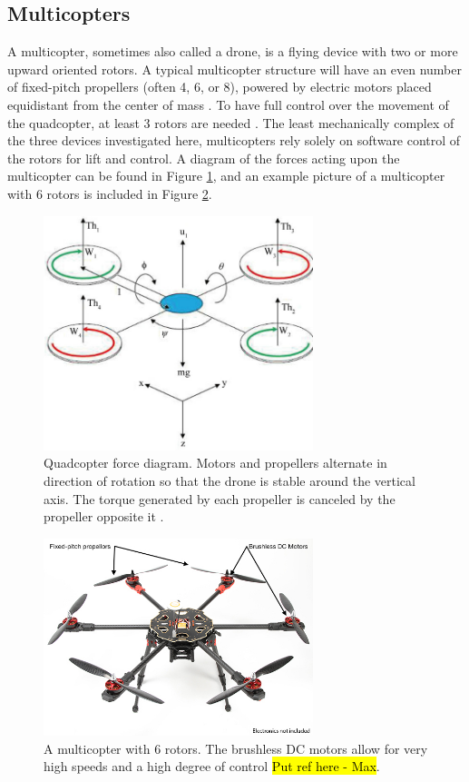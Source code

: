 \subsection{Multicopters}
A multicopter, sometimes also called a drone, is a flying device with two or more upward oriented rotors. A typical multicopter structure will have an even number of fixed-pitch propellers (often 4, 6, or 8), powered by electric motors placed equidistant from the center of mass \cite{multicopter_background}. To have full control over the movement of the quadcopter, at least 3 rotors are needed \cite{multicopter_dynamics_2}. The least mechanically complex of the three devices investigated here, multicopters rely solely on software control of the rotors for lift and control. A diagram of the forces acting upon the multicopter can be found in Figure \ref{fig:quad_diagram}, and an example picture of a multicopter with 6 rotors is included in Figure \ref{fig:multicopter_hex}.\par
\begin{figure}[ht]
\centering
\includegraphics[width=0.70\textwidth]{img/quad_force_diagram.jpg}
\caption{Quadcopter force diagram. Motors and propellers alternate in direction of rotation so that the drone is stable around the vertical axis. The torque generated by each propeller is canceled by the propeller opposite it \cite{multicopter_dynamics_3}.}
\label{fig:quad_diagram}
\end{figure}\par
\begin{figure}[ht]
\centering
\includegraphics[width=0.70\textwidth]{img/hexacopter.jpg}
\caption{A multicopter with 6 rotors. The brushless DC motors allow for very high speeds and a high degree of control \hl{Put ref here - Max}.}
\label{fig:multicopter_hex}
\end{figure}\par
